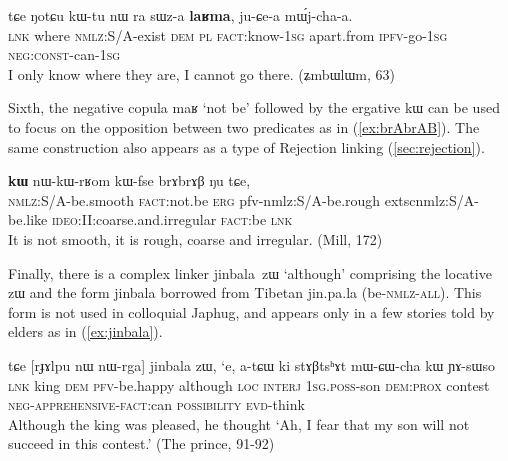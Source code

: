 \documentclass[oldfontcommands,oneside,a4paper,11pt]{article}
\newcommand{\ipa}[1]{{\phon \mbox{#1}}} %
\newcommand{\refb}[1]{(\ref{#1})}
\begin{document}
 \begin{exe}
\ex \label{ex:sWza.laRma}
\gll
 \ipa{tɕe}  	\ipa{ŋotɕu}  	\ipa{kɯ-tu}  	\ipa{nɯ} \ipa{ra}  	\ipa{sɯz-a}  	\ipa{\textbf{laʁma},}  	\ipa{ju-ɕe-a}  	\ipa{mɯ́j-cha-a.}  	\\
 \textsc{lnk} where \textsc{nmlz}:S/A-exist \textsc{dem} \textsc{pl} \textsc{fact}:know-\textsc{1sg} apart.from \textsc{ipfv}-go-\textsc{1sg} \textsc{neg:const}-can-\textsc{1sg}\\
\glt I only know where they are, I cannot go there. (ʑmbɯlɯm, 63)
\end{exe}
Sixth, the negative copula \ipa{maʁ}  `not be' followed by the ergative \ipa{kɯ} can be used to focus on the opposition between two predicates as in \refb{ex:brAbrAB}. The same construction also appears as a type of Rejection linking \refb{sec:rejection}.
\begin{exe}
\ex \label{ex:brAbrAB}
\gll
[\ipa{kɯ-mpɕu}]  	\ipa{\textbf{maʁ}}  	\ipa{\textbf{kɯ}}  	\ipa{nɯ-kɯ-rʁom}  	\ipa{kɯ-fse}  	\ipa{brɤbrɤβ}  	\ipa{ŋu}  	\ipa{tɕe,}  \\
\textsc{nmlz:S/A}-be.smooth \textsc{fact}:not.be \textsc{erg}   {pfv-nmlz:S/A}-be.rough extsc{nmlz:S/A}-be.like \textsc{ideo}:II:coarse.and.irregular \textsc{fact}:be  \textsc{lnk} \\
\glt It is not smooth, it is rough, coarse and irregular. (Mill, 172)
\end{exe}

Finally, there is a complex linker \ipa{jinbala zɯ} `although' comprising the locative \ipa{zɯ} and the form \ipa{jinbala} borrowed from Tibetan \ipa{jin.pa.la} (be-\textsc{nmlz-all}). This form is not used in colloquial Japhug, and appears only in a few stories told by elders as in \refb{ex:jinbala}.

\begin{exe}
\ex \label{ex:jinbala}
\gll 
\ipa{tɕe}  	[\ipa{rɟɤlpu}  	\ipa{nɯ}  	\ipa{nɯ-rga}]  	\ipa{jinbala}  	\ipa{zɯ,}  	\ipa{`e,}  	\ipa{a-tɕɯ}  	\ipa{ki}  	\ipa{stɤβtsʰɤt}  	\ipa{mɯ-ɕɯ-cha}  	\ipa{kɯ}  	\ipa{ɲɤ-sɯso}  \\
\textsc{lnk} king \textsc{dem} \textsc{pfv}-be.happy although \textsc{loc} \textsc{interj} \textsc{1sg.poss}-son \textsc{dem:prox} contest \textsc{neg-apprehensive-fact}:can \textsc{possibility} \textsc{evd}-think \\
\glt Although the king was pleased, he thought `Ah, I fear that my son will not succeed in this contest.' (The prince, 91-92)
 \end{exe}
\end{document}
